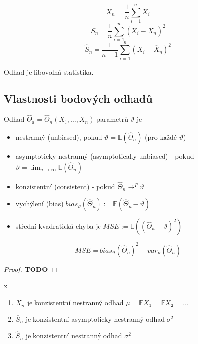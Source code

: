 \documentclass[../main.tex]{subfiles}
\begin{document}
\begin{example}
    \[\overline{X}_n = \frac{1}{n}\sum^n_{i=1}X_i\]
    \[\overline{S}_n = \frac{1}{n}\sum^n_{i=1}(X_i - \overline{X}_n)^2\]
    \[\widehat{S}_n = \frac{1}{n-1}\sum^n_{i=1}(X_i - \overline{X}_n)^2 \]
\end{example}
\begin{definition}
    Odhad je libovolná statistika.
\end{definition}

\subsection{Vlastnosti bodových odhadů}

\begin{definition}
    Odhad $\widehat{\Theta}_n = \widehat{\Theta}_n(X_1,\dots,X_n)$ parametrů $\vartheta$ je
    \begin{itemize}
        \item nestranný (unbiased), pokud $\vartheta = \mathbb{E}(\widehat{\Theta}_n)$ (pro každé $\vartheta$)
        \item asymptoticky nestranný (asymptotically unbiased) - pokud $\vartheta = \lim_{n \rightarrow \infty} \mathbb{E}(\widehat{\Theta}_n)$
        \item konzistentní (consistent) - pokud $\widehat{\Theta}_n \rightarrow^P \vartheta$
        \item vychýlení (bias) $bias_\vartheta (\widehat{\Theta}_n):=\mathbb{E}(\widehat{\Theta}_n - \vartheta)$
        \item střední kvadratická chyba je $MSE := \mathbb{E}((\widehat{\Theta}_n - \vartheta)^2)$
    \end{itemize}

\end{definition}
\begin{theorem}
    \[MSE = bias_\vartheta(\widehat{\Theta}_n)^2 + var_\vartheta(\widehat{\Theta}_n)\]
    \begin{proof}
        \textbf{TODO}
    \end{proof}
\end{theorem}
\begin{theorem}
    {\color{white} x}
    \begin{enumerate}
        \item $\overline{X}_n$ je konzistentní nestranný odhad $\mu = \mathbb{E}X_1 = \mathbb{E}X_2 =\dots$
        \item $\overline{S}_n$ je konzistentní asymptoticky nestranný odhad $\sigma^2$
        \item $\widehat{S}_n$ je konzistentní nestranný odhad $\sigma^2$
    \end{enumerate}
\end{theorem}
\end{document}
